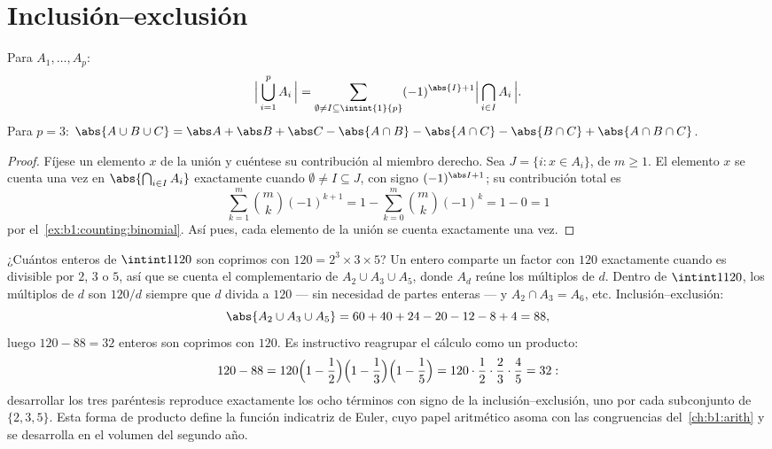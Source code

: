 \section{Inclusión--exclusión}

\begin{theorem}\label{thm:b1:counting:inclexcl}
Para  $A_1, \dots, A_p$:
\[
\Bigl|\, \bigcup_{i=1}^{p} A_i \,\Bigr|
= \sum_{\emptyset \neq I \subseteq \intint{1}{p}}
(-1)^{\abs{I}+1} \Bigl|\, \bigcap_{i \in I} A_i \,\Bigr| .
\]
Para $p = 3$:
$\abs{A \cup B \cup C} = \abs A + \abs B + \abs C - \abs{A \cap B} -
\abs{A \cap C} - \abs{B \cap C} + \abs{A \cap B \cap C}$.
\end{theorem}

\begin{proof}
Fíjese un elemento $x$ de la unión y cuéntese su contribución al
miembro derecho. Sea $J = \{i : x \in A_i\}$, de  $m \geq 1$. El
elemento $x$ se cuenta una vez en $\abs{\bigcap_{i \in I} A_i}$
exactamente cuando $\emptyset \neq I \subseteq J$, con signo
$(-1)^{\abs I + 1}$; su contribución total es
\[
\sum_{k=1}^{m} \binom{m}{k} (-1)^{k+1}
= 1 - \sum_{k=0}^{m} \binom mk (-1)^k = 1 - 0 = 1
\]
por el~\cref{ex:b1:counting:binomial}. Así pues, cada elemento de la
unión se cuenta exactamente una vez.
\end{proof}

\begin{example}\label{ex:b1:counting:coprime}
¿Cuántos enteros de $\intint1{120}$ son coprimos con
$120 = 2^3 \times 3 \times 5$? Un entero comparte un factor con $120$
exactamente cuando es divisible por $2$, $3$ o $5$, así que se cuenta el
complementario de $A_2 \cup A_3 \cup A_5$, donde $A_d$ reúne los
múltiplos de $d$. Dentro de $\intint1{120}$, los múltiplos de $d$ son
$120/d$ siempre que $d$ divida a $120$ --- sin necesidad de partes
enteras --- y $A_2 \cap A_3 = A_6$, etc. Inclusión--exclusión:
\[
\abs{A_2 \cup A_3 \cup A_5}
= 60 + 40 + 24 - 20 - 12 - 8 + 4 = 88 ,
\]
luego $120 - 88 = 32$ enteros son coprimos con $120$. Es instructivo
reagrupar el cálculo como un producto:
\[
120 - 88 = 120\Bigl(1 - \frac12\Bigr)\Bigl(1 -
\frac13\Bigr)\Bigl(1 - \frac15\Bigr) = 120 \cdot \frac12 \cdot
\frac23 \cdot \frac45 = 32 :
\]
desarrollar los tres paréntesis reproduce exactamente los ocho términos
con signo de la inclusión--exclusión, uno por cada subconjunto de
$\{2, 3, 5\}$. Esta forma de producto define la función indicatriz de
Euler, cuyo papel aritmético asoma con las congruencias
del~\cref{ch:b1:arith} y se desarrolla en el volumen del segundo año.
\end{example}


